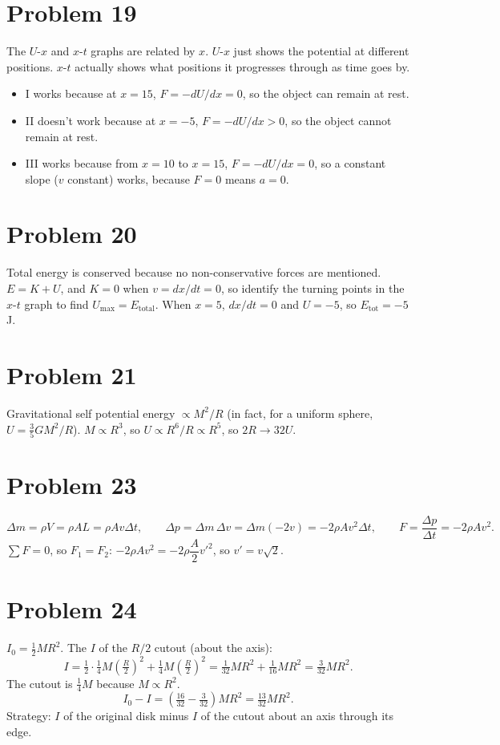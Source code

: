 \documentclass[11pt]{article}
\begin{document}
\section*{Problem 19}
The $U$-$x$ and $x$-$t$ graphs are related by $x$. $U$-$x$ just shows the potential at different positions. $x$-$t$ actually shows what positions it progresses through as time goes by.
\begin{itemize}[leftmargin=*, itemsep=0.25em]
\item I works because at $x=15$, $F=-dU/dx=0$, so the object can remain at rest.
\item II doesn't work because at $x=-5$, $F=-dU/dx>0$, so the object cannot remain at rest.
\item III works because from $x=10$ to $x=15$, $F=-dU/dx=0$, so a constant slope ($v$ constant) works, because $F=0$ means $a=0$.
\end{itemize}

\section*{Problem 20}
Total energy is conserved because no non-conservative forces are mentioned.
$E=K+U$, and $K=0$ when $v=dx/dt=0$, so identify the turning points in the $x$-$t$ graph to find $U_{\max}=E_{\text{total}}$.
When $x=5$, $dx/dt=0$ and $U=-5$, so $E_{\text{tot}}=-5$ J.

\section*{Problem 21}
Gravitational self potential energy $\propto M^2/R$ (in fact, for a uniform sphere, $U=\tfrac35GM^2/R$).
$M\propto R^3$, so $U\propto R^6/R\propto R^5$, so $2R\to 32U$.

\section*{Problem 23}
\[
\Delta m=\rho V=\rho AL=\rho Av\Delta t,\qquad
\Delta p=\Delta m\,\Delta v=\Delta m(-2v)=-2\rho Av^2\Delta t,\qquad
F=\frac{\Delta p}{\Delta t}=-2\rho Av^2.
\]
$\sum F=0$, so $F_1=F_2$: $-2\rho Av^2=-2\rho\dfrac A2v'^2$, so $v'=v\sqrt2$.

\section*{Problem 24}
$I_0=\tfrac12MR^2$. The $I$ of the $R/2$ cutout (about the axis):
\[
I=\tfrac12\cdot\tfrac14M\left(\tfrac R2\right)^2+\tfrac14M\left(\tfrac R2\right)^2=\tfrac1{32}MR^2+\tfrac1{16}MR^2=\tfrac3{32}MR^2.
\]
The cutout is $\tfrac14M$ because $M\propto R^2$.
\[
I_0-I=\left(\tfrac{16}{32}-\tfrac3{32}\right)MR^2=\tfrac{13}{32}MR^2.
\]
Strategy: $I$ of the original disk minus $I$ of the cutout about an axis through its edge.
\end{document}
